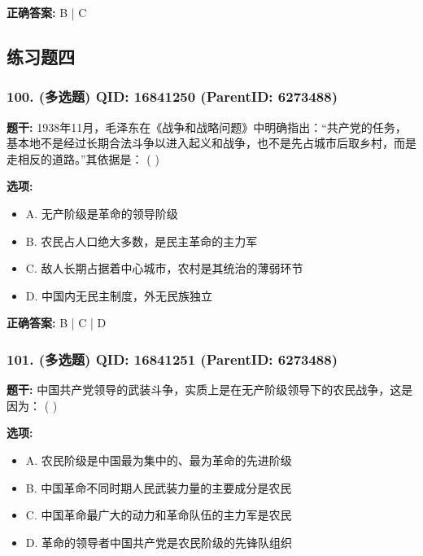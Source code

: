 \documentclass[12pt,UTF8]{ctexart}
\begin{document}
\textbf{正确答案:}
B | C

\vspace{0.3em}\hrulefill\vspace{0.7em}

\subsection*{练习题四}

\subsubsection*{100. (多选题) \small QID: 16841250 (ParentID: 6273488)}

\textbf{题干:}
1938年11月，毛泽东在《战争和战略问题》中明确指出：“共产党的任务，基本地不是经过长期合法斗争以进入起义和战争，也不是先占城市后取乡村，而是走相反的道路。”其依据是： ( )



\textbf{选项:}
\begin{itemize}[leftmargin=*]

  \item A. 无产阶级是革命的领导阶级

  \item B. 农民占人口绝大多数，是民主革命的主力军

  \item C. 敌人长期占据着中心城市，农村是其统治的薄弱环节

  \item D. 中国内无民主制度，外无民族独立

\end{itemize}

\textbf{正确答案:}
B | C | D

\vspace{0.3em}\hrulefill\vspace{0.7em}

\subsubsection*{101. (多选题) \small QID: 16841251 (ParentID: 6273488)}

\textbf{题干:}
中国共产党领导的武装斗争，实质上是在无产阶级领导下的农民战争，这是因为： ( )



\textbf{选项:}
\begin{itemize}[leftmargin=*]

  \item A. 农民阶级是中国最为集中的、最为革命的先进阶级

  \item B. 中国革命不同时期人民武装力量的主要成分是农民

  \item C. 中国革命最广大的动力和革命队伍的主力军是农民

  \item D. 革命的领导者中国共产党是农民阶级的先锋队组织

\end{itemize}
\end{document}

